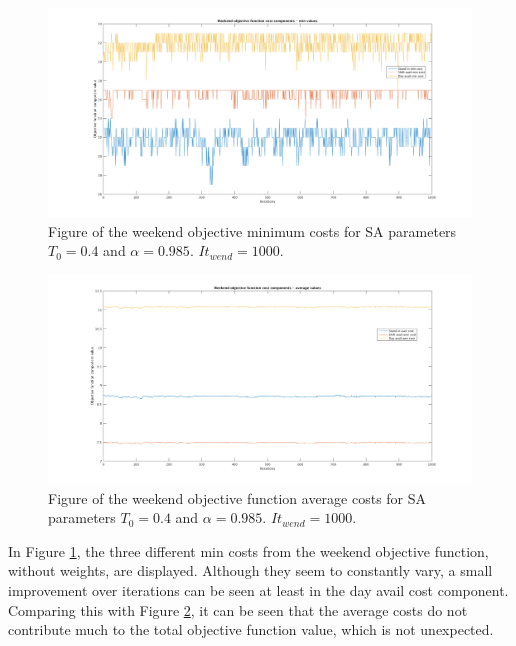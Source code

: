 \begin{figure}[!h]
\centering
\includegraphics[width=\textwidth, trim = 100px 50px 100px 20px, clip]{Chapters/ImagesEmelie/Components_1000_20.png}
\caption{Figure of the weekend objective minimum costs for SA parameters $T_0 = 0.4$ and $\alpha = 0.985$. $It_{wend} = 1000$.}
\label{fig:obj_fun_comp}
\end{figure}

\begin{figure}[!h]
\centering
\includegraphics[width=\textwidth, trim = 100px 50px 100px 20px, clip]{Chapters/ImagesEmelie/Components_av_1000_20.png}
\caption{Figure of the weekend objective function average costs for SA parameters $T_0 = 0.4$ and $\alpha = 0.985$. $It_{wend} = 1000$.}
\label{fig:obj_fun_comp_aver}
\end{figure}


In Figure \ref{fig:obj_fun_comp}, the three different min costs from the weekend objective function, without weights, are displayed. Although they seem to constantly vary, a small improvement over iterations can be seen at least in the day avail cost component. Comparing this with Figure \ref{fig:obj_fun_comp_aver}, it can be seen that the average costs do not contribute much to the total objective function value, which is not unexpected.


